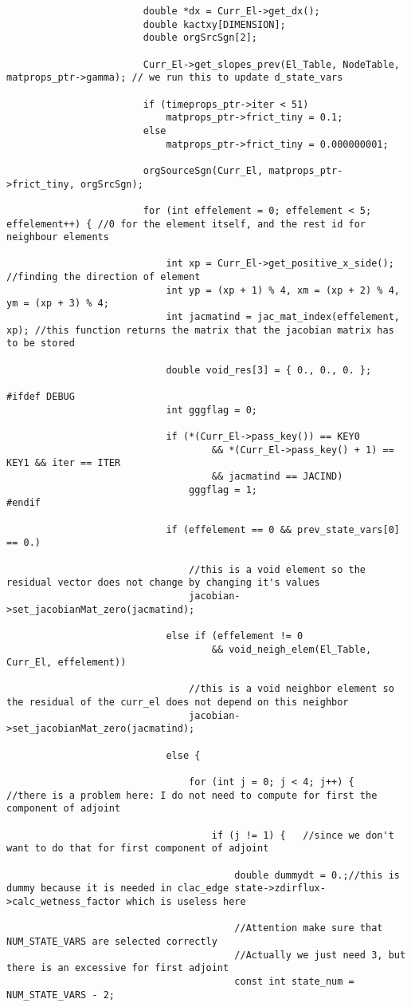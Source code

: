 \documentclass[a4paper,10pt]{article}
\begin{document}
\begin{lstlisting}
						double *dx = Curr_El->get_dx();
						double kactxy[DIMENSION];
						double orgSrcSgn[2];

						Curr_El->get_slopes_prev(El_Table, NodeTable, matprops_ptr->gamma); // we run this to update d_state_vars

						if (timeprops_ptr->iter < 51)
							matprops_ptr->frict_tiny = 0.1;
						else
							matprops_ptr->frict_tiny = 0.000000001;

						orgSourceSgn(Curr_El, matprops_ptr->frict_tiny, orgSrcSgn);

						for (int effelement = 0; effelement < 5; effelement++) { //0 for the element itself, and the rest id for neighbour elements

							int xp = Curr_El->get_positive_x_side(); //finding the direction of element
							int yp = (xp + 1) % 4, xm = (xp + 2) % 4, ym = (xp + 3) % 4;
							int jacmatind = jac_mat_index(effelement, xp); //this function returns the matrix that the jacobian matrix has to be stored

							double void_res[3] = { 0., 0., 0. };

#ifdef DEBUG
							int gggflag = 0;

							if (*(Curr_El->pass_key()) == KEY0
									&& *(Curr_El->pass_key() + 1) == KEY1 && iter == ITER
									&& jacmatind == JACIND)
								gggflag = 1;
#endif

							if (effelement == 0 && prev_state_vars[0] == 0.)

								//this is a void element so the residual vector does not change by changing it's values
								jacobian->set_jacobianMat_zero(jacmatind);

							else if (effelement != 0
									&& void_neigh_elem(El_Table, Curr_El, effelement))

								//this is a void neighbor element so the residual of the curr_el does not depend on this neighbor
								jacobian->set_jacobianMat_zero(jacmatind);

							else {

								for (int j = 0; j < 4; j++) {	//there is a problem here: I do not need to compute for first the component of adjoint

									if (j != 1) {	//since we don't want to do that for first component of adjoint

										double dummydt = 0.;//this is dummy because it is needed in clac_edge state->zdirflux->calc_wetness_factor which is useless here

										//Attention make sure that NUM_STATE_VARS are selected correctly
										//Actually we just need 3, but there is an excessive for first adjoint
										const int state_num = NUM_STATE_VARS - 2;


\end{lstlisting}
\end{document}

